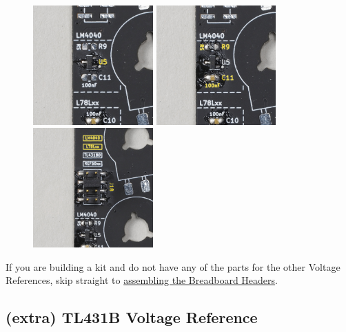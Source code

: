 \documentclass[12pt, a4paper]{article}
\begin{document}
\begin{figure}[H]
    \centering
    \includegraphics[width=46mm]{images/16_01_lm4040_soldered.jpg}
    \hspace{2mm}
    \includegraphics[width=46mm]{images/16_02_cap_and_bias_resistor_soldered.jpg}
    \hspace{2mm}
    \includegraphics[width=46mm]{images/16_03_header_and_jumper.jpg}
\end{figure}

If you are building a kit and do not have any of the parts for the other Voltage References,
skip straight to \hyperref[sec:breadboard_headers]{assembling the Breadboard Headers}.

\pagebreak
\subsection{\smaller (extra) \enspace \larger TL431B Voltage Reference}
\end{document}
